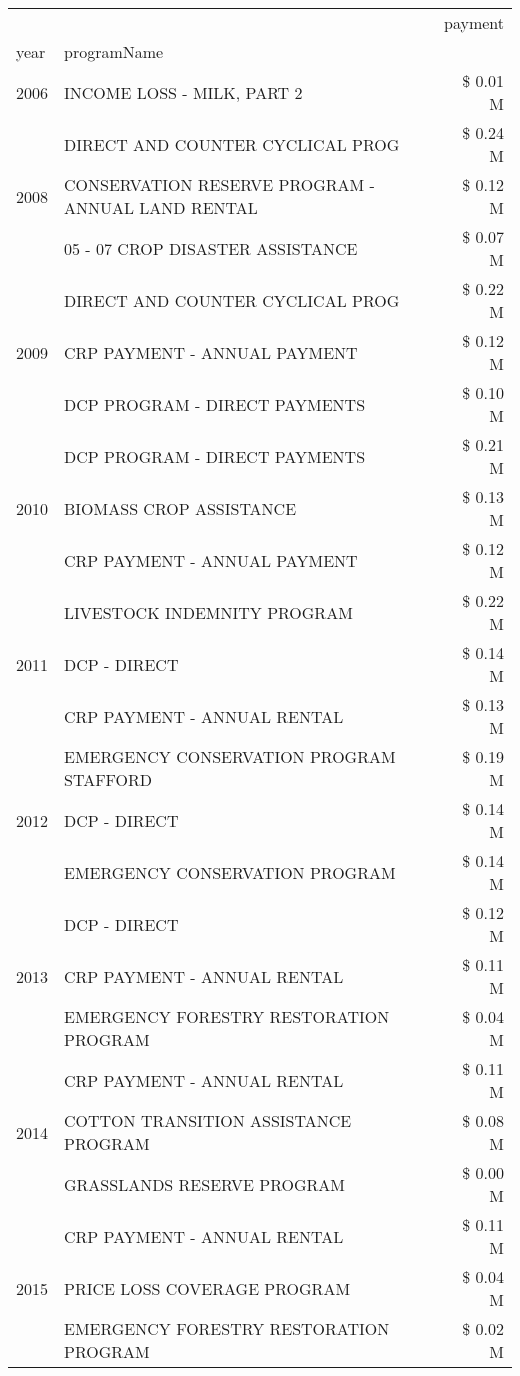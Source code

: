 \begin{tabular}{llr}
\toprule
 &  & payment \\
year & programName &  \\
\midrule
2006 & INCOME LOSS - MILK, PART 2 & \$ 0.01 M \\
\cline{1-3}
\multirow[t]{3}{*}{2008} & DIRECT AND COUNTER CYCLICAL PROG & \$ 0.24 M \\
 & CONSERVATION RESERVE PROGRAM - ANNUAL LAND RENTAL & \$ 0.12 M \\
 & 05 - 07 CROP DISASTER ASSISTANCE & \$ 0.07 M \\
\cline{1-3}
\multirow[t]{3}{*}{2009} & DIRECT AND COUNTER CYCLICAL PROG & \$ 0.22 M \\
 & CRP PAYMENT - ANNUAL PAYMENT & \$ 0.12 M \\
 & DCP PROGRAM - DIRECT PAYMENTS & \$ 0.10 M \\
\cline{1-3}
\multirow[t]{3}{*}{2010} & DCP PROGRAM - DIRECT PAYMENTS & \$ 0.21 M \\
 & BIOMASS CROP ASSISTANCE & \$ 0.13 M \\
 & CRP PAYMENT - ANNUAL PAYMENT & \$ 0.12 M \\
\cline{1-3}
\multirow[t]{3}{*}{2011} & LIVESTOCK INDEMNITY PROGRAM & \$ 0.22 M \\
 & DCP - DIRECT & \$ 0.14 M \\
 & CRP PAYMENT - ANNUAL RENTAL & \$ 0.13 M \\
\cline{1-3}
\multirow[t]{3}{*}{2012} & EMERGENCY CONSERVATION PROGRAM STAFFORD & \$ 0.19 M \\
 & DCP - DIRECT & \$ 0.14 M \\
 & EMERGENCY CONSERVATION PROGRAM & \$ 0.14 M \\
\cline{1-3}
\multirow[t]{3}{*}{2013} & DCP - DIRECT & \$ 0.12 M \\
 & CRP PAYMENT - ANNUAL RENTAL & \$ 0.11 M \\
 & EMERGENCY FORESTRY RESTORATION PROGRAM & \$ 0.04 M \\
\cline{1-3}
\multirow[t]{3}{*}{2014} & CRP PAYMENT - ANNUAL RENTAL & \$ 0.11 M \\
 & COTTON TRANSITION ASSISTANCE PROGRAM & \$ 0.08 M \\
 & GRASSLANDS RESERVE PROGRAM & \$ 0.00 M \\
\cline{1-3}
\multirow[t]{3}{*}{2015} & CRP PAYMENT - ANNUAL RENTAL & \$ 0.11 M \\
 & PRICE LOSS COVERAGE PROGRAM & \$ 0.04 M \\
 & EMERGENCY FORESTRY RESTORATION PROGRAM & \$ 0.02 M \\

\end{tabular}
